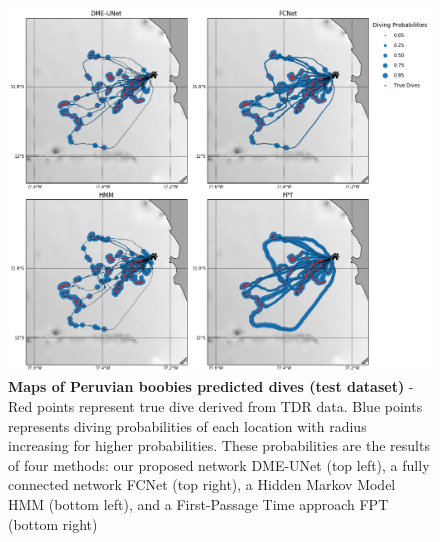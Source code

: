 \documentclass{article}
\begin{document}
\begin{figure}[h]
  \centering
  \includegraphics[scale=0.5]{figure4a.png}
  \caption{\textbf{Maps of Peruvian boobies predicted dives (test dataset)} - Red points represent true dive derived from TDR data. Blue points represents diving probabilities of each location with radius increasing for higher probabilities. These probabilities are the results of four methods: our proposed network DME-UNet (top left), a fully connected network FCNet (top right), a Hidden Markov Model HMM (bottom left), and a First-Passage Time approach FPT (bottom right)}
  \label{figure4a}
\end{figure}
\end{document}
